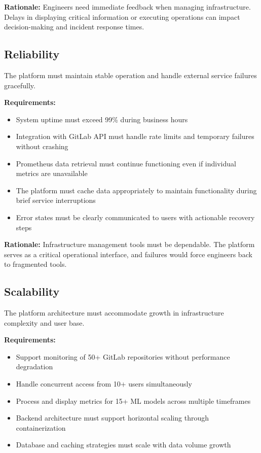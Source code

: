 \textbf{Rationale:} Engineers need immediate feedback when managing infrastructure. Delays in displaying critical information or executing operations can impact decision-making and incident response times.

\subsection{Reliability}

The platform must maintain stable operation and handle external service failures gracefully.

\textbf{Requirements:}
\begin{itemize}
    \item System uptime must exceed 99\% during business hours
    \item Integration with GitLab API must handle rate limits and temporary failures without crashing
    \item Prometheus data retrieval must continue functioning even if individual metrics are unavailable
    \item The platform must cache data appropriately to maintain functionality during brief service interruptions
    \item Error states must be clearly communicated to users with actionable recovery steps
\end{itemize}

\textbf{Rationale:} Infrastructure management tools must be dependable. The platform serves as a critical operational interface, and failures would force engineers back to fragmented tools.

\subsection{Scalability}

The platform architecture must accommodate growth in infrastructure complexity and user base.

\textbf{Requirements:}
\begin{itemize}
    \item Support monitoring of 50+ GitLab repositories without performance degradation
    \item Handle concurrent access from 10+ users simultaneously
    \item Process and display metrics for 15+ ML models across multiple timeframes
    \item Backend architecture must support horizontal scaling through containerization
    \item Database and caching strategies must scale with data volume growth
\end{itemize}

